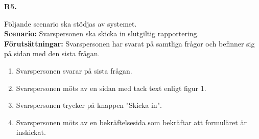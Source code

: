 \documentclass{article}
\begin{document}
   \vspace{1em}
\noindent \large{\textbf{R5.}}
    \normalsize{Följande scenario ska stödjas av systemet.
        \\
       \textbf{Scenario:} Svarspersonen ska skicka in slutgiltig rapportering.
        \\
        \textbf{Förutsättningar:} Svarspersonen har svarat på samtliga frågor och befinner sig på sidan med den sista frågan.
            \begin{enumerate}
                \item Svarspersonen svarar på sista frågan.
                \item Svarspersonen möts av en sidan med tack text enligt figur 1.
                \item Svarspersonen trycker på knappen "Skicka in".
                \item  Svarspersonen möts av en bekräftelsesida som bekräftar att formuläret är inskickat.
            \end{enumerate}
}
\end{document}
